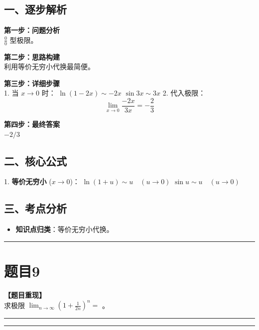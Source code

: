 \documentclass[12pt, a4paper]{ctexart}
\newcommand{\TopSeparator}{
    \par\noindent\rule{\textwidth}{1.5pt}\vspace{0.5em} %
}
\newcommand{\AnalysisSeparator}{
    \par\noindent\rule{\textwidth}{0.5pt}\vspace{0.2em}\hrule\vspace{0.5em} %
}
\newenvironment{RedAnalysis}{
    \par
    \color{red} %
}{
    \par
    \color{black} %
}
\begin{document}
\begin{RedAnalysis}

\subsection*{一、逐步解析}

\textbf{第一步：问题分析} \\
$\frac{0}{0}$ 型极限。

\textbf{第二步：思路构建} \\
利用等价无穷小代换最简便。

\textbf{第三步：详细步骤} \\
1. 当 $x \to 0$ 时：
   $\ln(1-2x) \sim -2x$
   $\sin 3x \sim 3x$
2. 代入极限：
   \[ \lim_{x\to 0} \frac{-2x}{3x} = -\frac{2}{3} \]

\textbf{第四步：最终答案} \\
$-2/3$

\subsection*{二、核心公式}
1. \textbf{等价无穷小} ($x \to 0$)：
   $\ln(1+u) \sim u \quad (u \to 0)$
   $\sin u \sim u \quad (u \to 0)$

\subsection*{三、考点分析}
\begin{itemize}
    \item \textbf{知识点归类}：等价无穷小代换。
\end{itemize}

\end{RedAnalysis}

\vspace{2em}

\TopSeparator
\section*{题目9}

\textbf{【题目重现】} \\
求极限 $ \lim_{n\to\infty}\left(1+\frac{1}{2n}\right)^n= $ \underline{\hspace{2cm}}。

\AnalysisSeparator
\end{document}
